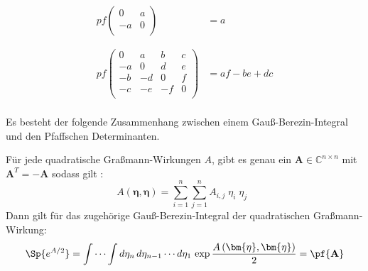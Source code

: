 \begin{align}
pf\left(\begin{array}{cc}  
        0  &  a  \\
        -a &  0  \\
        \end{array} \right) &= a \nonumber \\
\label{eq: expl. pfaffian}\\
& \nonumber\\
pf\left(\begin{array}{cccc}  
        0  &  a  &  b & c \\
        -a &  0  &  d & e \\
        -b & -d  &  0 & f \\
        -c & -e  & -f & 0 \\
        \end{array} \right) &= af - be +dc \nonumber 
\end{align}\\
\newpage
\noindent Es besteht der folgende Zusammenhang zwischen einem Gauß-Berezin-Integral und den Pfaffschen Determinanten.

\begin{grayframe}[frametitle = {Gauß-Berezin-Integrale}]
Für jede quadratische Graßmann-Wirkungen $A$, gibt es genau ein $ \mathbf{A}\in\mathbb{C}^{n\times n}$ mit $\mathbf{A}^T = -\mathbf{A}$ sodass gilt :
    \begin{equation} \label{Satz: Gauß-Berezin 1}
        A\left(\bm{\eta}, \bm{\eta} \right) = \sum_{i=1}^n \sum_{j=1}^n A_{i,j}\; \eta_i\; \eta_j  \;\;
    \end{equation}
Dann gilt für das zugehörige Gauß-Berezin-Integral der quadratischen Graßmann-Wirkung:
    \begin{equation} \label{Satz: Gauß-Berezin 2}
        \Sp{e^{A/2}} = \int \cdots \int d\eta_n\,d\eta_{n-1}\cdots d\eta_1\, \exp{\frac{A\left(\bm{\eta}, \bm{\eta}\right)}{2}} = \pf{\mathbf{A}}
    \end{equation}
\end{grayframe}

